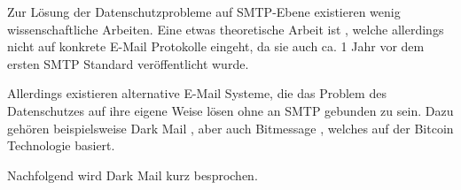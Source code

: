 Zur Lösung der Datenschutzprobleme auf SMTP-Ebene existieren wenig wissenschaftliche Arbeiten. Eine etwas theoretische Arbeit ist  , welche allerdings nicht auf konkrete E-Mail Protokolle eingeht, da sie auch ca. 1 Jahr vor dem ersten SMTP Standard  veröffentlicht wurde.

Allerdings existieren alternative E-Mail Systeme, die das Problem des Datenschutzes auf ihre eigene Weise lösen ohne an SMTP gebunden zu sein. Dazu gehören beispielsweise Dark Mail , aber auch Bitmessage , welches auf der Bitcoin  Technologie basiert.

Nachfolgend wird Dark Mail kurz besprochen.